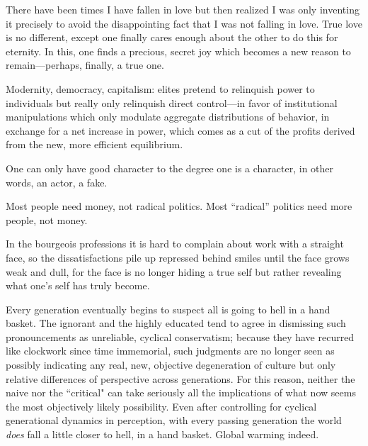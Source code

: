 \documentclass[12pt, twocolumn, oneside]{article}  	%
\begin{document}
\newpage


There have been times I have fallen in love but then realized I was only inventing it precisely to avoid the disappointing fact that I was not falling in love. True love is no different, except one finally cares enough about the other to do this for eternity. In this, one finds a precious, secret joy which becomes a new reason to remain---perhaps, finally, a true one.

\vspace{3em}

Modernity, democracy, capitalism: elites pretend to relinquish power to individuals but really only relinquish direct control---in favor of institutional manipulations which only modulate aggregate distributions of behavior, in exchange for a net increase in power, which comes as a cut of the profits derived from the new, more efficient equilibrium.

\vspace{3em}

One can only have good character to the degree one is a character, in other words, an actor, a fake.

\vspace{3em}

Most people need money, not radical politics. Most ``radical'' politics need more people, not money.

\vspace{3em}

\newpage

\setcounter{page}{4}
\renewcommand{\thepage}{\arabic{page}}

In the bourgeois professions it is hard to complain about work with a straight face, so the dissatisfactions pile up repressed behind smiles until the face grows weak and dull, for the face is no longer hiding a true self but rather revealing what one's self has truly become.

\vspace{3em}

Every generation eventually begins to suspect all is going to hell in a hand basket. The ignorant and the highly educated tend to agree in dismissing such pronouncements as unreliable, cyclical conservatism; because they have recurred like clockwork since time immemorial, such judgments are no longer seen as possibly indicating any real, new, objective degeneration of culture but only relative differences of perspective across generations. For this reason, neither the naive nor the ``critical" can take seriously all the implications of what now seems the most objectively likely possibility. Even after controlling for cyclical generational dynamics in perception, with every passing generation the world \emph{does} fall a little closer to hell, in a hand basket. Global warming indeed.
\end{document}
